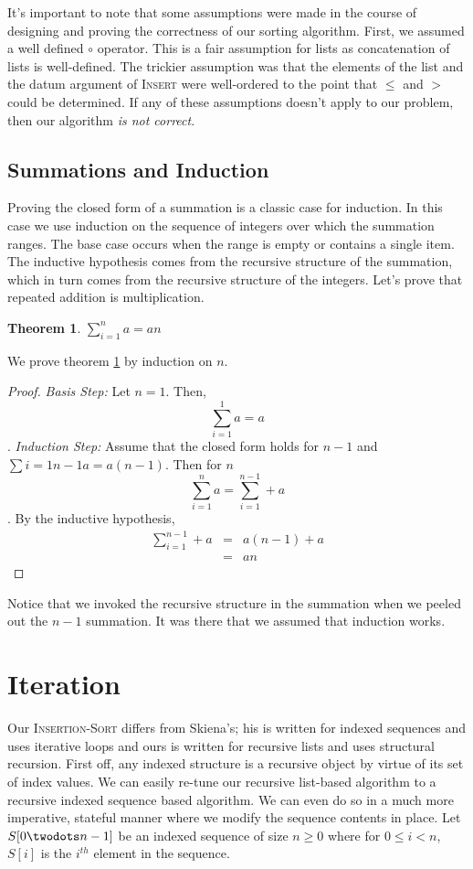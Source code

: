 \documentclass[]{tufte-handout}
\newtheorem{theorem}{Theorem}
\begin{document}
It's important to note that some assumptions were made in the course of designing and proving the correctness of our sorting algorithm.  First, we assumed a well defined $\circ$ operator.  This is a fair assumption for lists as concatenation of lists is well-defined.  The trickier assumption was that the elements of the list and the datum argument of \textsc{Insert} were well-ordered to the point that $\leq$ and $>$ could be determined. If any of these assumptions doesn't apply to our problem, then our algorithm \textit{is not correct}. 

\subsection{Summations and Induction}
 
Proving the closed form of a summation is a classic case for induction. In this case we use induction on the sequence of integers over which the summation ranges. The base case occurs when the range is empty or contains a single item. The inductive hypothesis comes from the recursive structure of the summation, which in turn comes from the recursive structure of the integers. Let's prove that repeated addition is multiplication.

\begin{theorem}
$\sum\limits_{i=1}^{n} a = an$
\label{th:sumexp}
\end{theorem}

We prove theorem \ref{th:sumexp} by induction on $n$.
\begin{proof}
\textit{Basis Step:} Let $n=1$. Then,
\[ \sum\limits_{i=1}^{1} a = a \].
\textit{Induction Step:} Assume that the closed form holds for $n-1$ and  $\sum\limits{i=1}{n-1} a = a(n-1)$.  Then for $n$
\[ \sum\limits_{i=1}^{n} a = \sum\limits_{i=1}^{n-1} + a \]. By the inductive hypothesis, 
\[ \begin{array}{rcl} \sum\limits_{i=1}^{n-1} + a &=& a(n-1) + a \\ &=& an \end{array} \]
\end{proof}
Notice that we invoked the recursive structure in the summation when we peeled out the $n-1$ summation. It was there that we assumed that induction works.

\section{Iteration}

Our \textsc{Insertion-Sort} differs from Skiena's; his is written for indexed sequences and uses iterative loops and ours is written for recursive lists and uses structural recursion.  First off, any indexed structure is a recursive object by virtue of its set of index values\sidenote{$[0,size) \equiv [0,0]\cup [1,size)$}.  We can easily re-tune our recursive list-based algorithm to a recursive indexed sequence based algorithm.  We can even do so in a much more imperative, stateful manner where we modify the sequence contents in place.  Let $S[0 \twodots n-1]$ be an indexed sequence of size $n\geq 0$ where for $0 \leq i < n$, $S[i]$ is the $i^{th}$ element in the sequence.  
\end{document}
